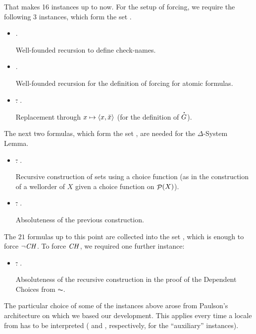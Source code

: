 That makes 16 instances up to now. For the setup of forcing, we
require the following 3 instances, which form the set
.

\begin{itemize}
\item {}.
  
  Well-founded recursion to define check-names.
\item {}.

  Well-founded recursion for the definition of forcing for atomic formulas.
\item
  \sout{.}
  .

  Replacement through $x\mapsto \langle x,\check{x}\rangle$ (for the
  definition of $\punto{G}$).
\end{itemize}
The next two formulas, which form the set
,
are needed for the $\Delta$-System Lemma.
\begin{itemize}
\item
  \sout{.}
  .

  Recursive construction of sets using a choice function (as in the
  construction of a wellorder of $X$ given a choice function on $\mathop{\mathcal{P}}(X)$).
\item
  \sout{.}
  .
  
  Absoluteness of the previous construction.
\end{itemize}
%
The $21$ formulas up to this point are collected into the set
, which is enough to
force $\neg\mathit{CH}$. To force $\mathit{CH}$, we required one further instance:
%
\begin{itemize}
\item
  \sout{.}
  .
  
  Absoluteness of the recursive construction in the proof of the
  Dependent Choices from $\AC$.
\end{itemize}

The particular choice of some of the instances above arose from
Paulson's architecture on which we based our development.
This applies every time
a locale from  has to be
interpreted ( and
, respectively, for the “auxiliary” instances).

